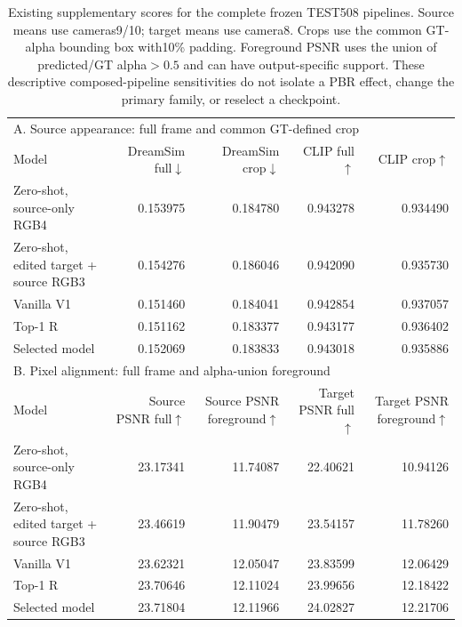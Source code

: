 \begin{table}[t]
\centering\scriptsize
\setlength{\tabcolsep}{4pt}
\begin{tabular}{lrrrr}
\toprule
\multicolumn{5}{l}{A. Source appearance: full frame and common GT-defined crop}\\
Model&DreamSim full$\downarrow$&DreamSim crop$\downarrow$&CLIP full$\uparrow$&CLIP crop$\uparrow$\\
\midrule
Zero-shot, source-only RGB4&0.153975&0.184780&0.943278&0.934490\\
Zero-shot, edited target + source RGB3&0.154276&0.186046&0.942090&0.935730\\
Vanilla V1&0.151460&0.184041&0.942854&0.937057\\
Top-1 R&0.151162&0.183377&0.943177&0.936402\\
Selected model&0.152069&0.183833&0.943018&0.935886\\
\midrule
\multicolumn{5}{l}{B. Pixel alignment: full frame and alpha-union foreground}\\
Model&\shortstack{Source PSNR\\full$\uparrow$}&\shortstack{Source PSNR\\foreground$\uparrow$}&\shortstack{Target PSNR\\full$\uparrow$}&\shortstack{Target PSNR\\foreground$\uparrow$}\\
\midrule
Zero-shot, source-only RGB4&23.17341&11.74087&22.40621&10.94126\\
Zero-shot, edited target + source RGB3&23.46619&11.90479&23.54157&11.78260\\
Vanilla V1&23.62321&12.05047&23.83599&12.06429\\
Top-1 R&23.70646&12.11024&23.99656&12.18422\\
Selected model&23.71804&12.11966&24.02827&12.21706\\
\bottomrule
\end{tabular}
\caption{Existing supplementary scores for the complete frozen TEST508 pipelines. Source means use cameras9/10; target means use camera8. Crops use the common GT-alpha bounding box with10\% padding. Foreground PSNR uses the union of predicted/GT alpha$>0.5$ and can have output-specific support. These descriptive composed-pipeline sensitivities do not isolate a PBR effect, change the primary family, or reselect a checkpoint.}
\label{tab:final-foreground}
\end{table}
